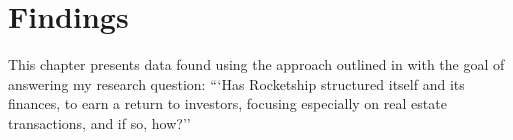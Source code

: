 \chapter{Findings}\label{ch:findings}\noindent
This chapter presents data found using the approach outlined in  with the goal of answering my research question: ```Has Rocketship structured itself and its finances, to earn a return to investors, focusing especially on real estate transactions, and if so, how?''

